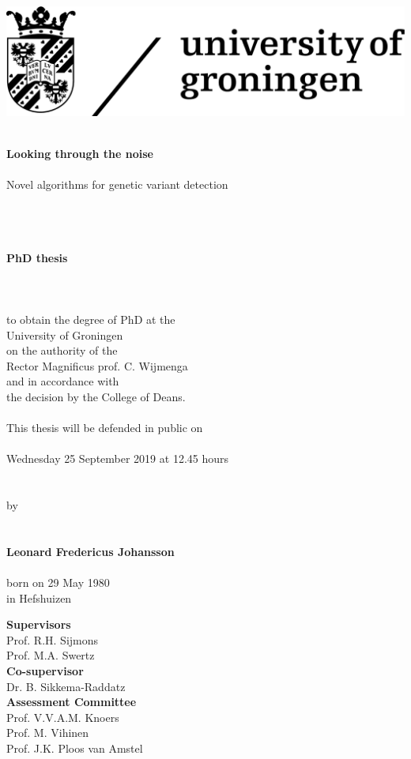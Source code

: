 \begin{flushleft}
	\includegraphics[scale=0.08]{img/rugr_logoen_zwart_rgb}
\end{flushleft}

\begin{center}
	\linespread{1.00} %
	~\\
	\huge
	\textbf{Looking through the noise}
	\\~\\
	\large
	Novel algorithms for genetic variant detection
	\\~\\~\\~\\
	\linespread{1.05} %
	
	
	\large
	\textbf{PhD thesis}
	\\~\\~\\~\\
	\normalsize
	to obtain the degree of PhD at the\\
	University of Groningen\\
	on the authority of the\\
	Rector Magnificus prof. C. Wijmenga\\
	and in accordance with \\
	the decision by the College of Deans.
	\\~\\
	This thesis will be defended in public on
	\\~\\
	Wednesday 25 September 2019 at 12.45 hours 
	\\~\\~\\
	by
	\\~\\~\\
	\large
	\textbf{Leonard Fredericus Johansson}
	\\~\\
	\normalsize
	born on 29 May 1980\\
	in Hefshuizen\\
	\normalsize
\end{center}

\clearpage

\noindent
\textbf{Supervisors}\\
Prof. R.H. Sijmons \\
Prof. M.A. Swertz \\

\noindent
\textbf{Co-supervisor}\\
Dr. B. Sikkema-Raddatz \\

\noindent
\textbf{Assessment Committee}\\
Prof. V.V.A.M. Knoers\\
Prof. M. Vihinen\\
Prof. J.K. Ploos van Amstel\\
